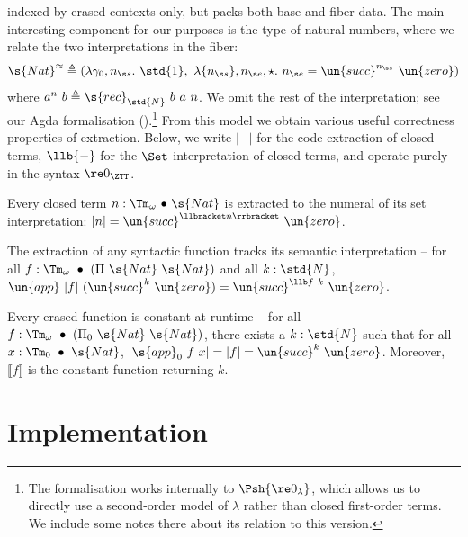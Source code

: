 indexed by erased contexts only, but packs both base and fiber data. The main
interesting component for our purposes is the type of natural numbers, where we
relate the two interpretations in the fiber: 
$$
\s{Nat}^{\approx} \triangleq (\lambda \gamma_0,n_{\s s}.\
\std{1},\ \lambda \{n_{\s s}\}, n_{\s e},\star.\ n_{\s e} = \un{succ}^{n_{\s
s}}\ \un{zero})
$$
where $a^n\ b \triangleq \s{rec}_{\std{N}}\ b\ a\ n$. We omit
the rest of the interpretation; see our Agda formalisation ().\footnote{The formalisation works internally to $\Psh{\re 0_\lambda}$, which allows us
to directly use a second-order model of $\lambda$ rather than closed first-order terms. We include some
notes there about its relation to this version.}
From this model we obtain various useful correctness properties of extraction. Below,
we write $|-|$ for the code extraction of closed terms, $\llb{-}$ for the $\Set$ interpretation
of closed terms, and operate purely in the syntax $\re 0_{\ZTT}$.

\begin{theorem}\label{thm:canon}
  Every closed term $n : \Tm_\omega\ {\bullet}\ \s{Nat}$ is extracted to the numeral of
  its set interpretation: $|n| = \un{succ}^{\llbracket n \rrbracket}\ \un{zero}$.
\end{theorem}

\begin{theorem}\label{thm:track}
  The extraction of any syntactic function tracks its semantic
  interpretation -- for all $f : \Tm_\omega\ \bullet\ (\Pi\ \s{Nat}\ \s{Nat})$ and all $k : \std{N}$,
  $\un{app}\ |f|\ (\un{succ}^k\ \un{zero}) = \un{succ}^{\llb f \ k}\ \un{zero}$.
\end{theorem}

\begin{theorem}\label{thm:non-inter}
  Every erased function is constant at runtime -- for all $f : \Tm_\omega\ \bullet\ (\Pi_0\ \s{Nat}\ \s{Nat})$, there exists a $k : \std{N}$ such that for all $x : \Tm_0\ \bullet\ \s{Nat}$,
  $|\s{app}_0\ f\ x | = | f | = \un{succ}^k\ \un{zero}$.
  Moreover, $\llbracket f \rrbracket$ is the constant function returning $k$.
\end{theorem}

\section{Implementation} \label{sec:implementation}

